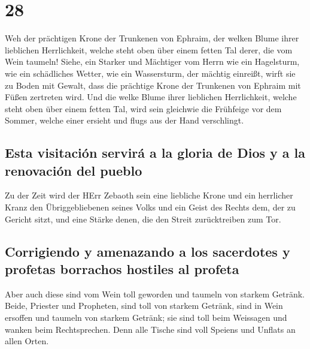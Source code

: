 \hypertarget{section-27}{%
\section{28}\label{section-27}}

 Weh der prächtigen Krone der Trunkenen von Ephraim, der
welken Blume ihrer lieblichen Herrlichkeit, welche steht oben über einem
fetten Tal derer, die vom Wein taumeln!  Siehe, ein
Starker und Mächtiger vom Herrn wie ein Hagelsturm, wie ein schädliches
Wetter, wie ein Wassersturm, der mächtig einreißt, wirft sie zu Boden
mit Gewalt,  dass die prächtige Krone der Trunkenen von
Ephraim mit Füßen zertreten wird.  Und die welke Blume
ihrer lieblichen Herrlichkeit, welche steht oben über einem fetten Tal,
wird sein gleichwie die Frühfeige vor dem Sommer, welche einer ersieht
und flugs aus der Hand verschlingt.

\hypertarget{esta-visitaciuxf3n-serviruxe1-a-la-gloria-de-dios-y-a-la-renovaciuxf3n-del-pueblo}{%
\subsection{Esta visitación servirá a la gloria de Dios y a la
renovación del
pueblo}\label{esta-visitaciuxf3n-serviruxe1-a-la-gloria-de-dios-y-a-la-renovaciuxf3n-del-pueblo}}

 Zu der Zeit wird der HErr Zebaoth sein eine liebliche
Krone und ein herrlicher Kranz den Übriggebliebenen seines Volks
 und ein Geist des Rechts dem, der zu Gericht sitzt, und
eine Stärke denen, die den Streit zurücktreiben zum Tor.

\hypertarget{corrigiendo-y-amenazando-a-los-sacerdotes-y-profetas-borrachos-hostiles-al-profeta}{%
\subsection{Corrigiendo y amenazando a los sacerdotes y profetas
borrachos hostiles al
profeta}\label{corrigiendo-y-amenazando-a-los-sacerdotes-y-profetas-borrachos-hostiles-al-profeta}}

 Aber auch diese sind vom Wein toll geworden und taumeln
von starkem Getränk. Beide, Priester und Propheten, sind toll von
starkem Getränk, sind in Wein ersoffen und taumeln von starkem Getränk;
sie sind toll beim Weissagen und wanken beim Rechtsprechen.
 Denn alle Tische sind voll Speiens und Unflats an allen
Orten.

